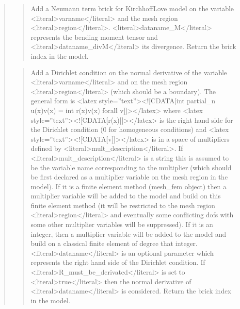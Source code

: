 \documentclass[a4paper,11pt,english]{sphinxmanual}
\begin{document}
\begin{quote}
\begin{quote}
\sphinxAtStartPar
Add a Neumann term brick for Kirchhoff\sphinxhyphen{}Love model
on the variable \textless{}literal\textgreater{}varname\textless{}/literal\textgreater{} and the mesh region \textless{}literal\textgreater{}region\textless{}/literal\textgreater{}.
\textless{}literal\textgreater{}dataname\_M\textless{}/literal\textgreater{} represents the bending moment tensor and  \textless{}literal\textgreater{}dataname\_divM\textless{}/literal\textgreater{}
its divergence.
Return the brick index in the model.
\end{quote}

\sphinxAtStartPar
{}
\begin{quote}

\sphinxAtStartPar
Add a Dirichlet condition on the normal derivative of the variable
\textless{}literal\textgreater{}varname\textless{}/literal\textgreater{} and on the mesh region \textless{}literal\textgreater{}region\textless{}/literal\textgreater{} (which should be a boundary).
The general form is
\textless{}latex style=”text”\textgreater{}\textless{}!{[}CDATA{[}int partial\_n u(x)v(x) = int r(x)v(x) forall v{]}{]}\textgreater{}\textless{}/latex\textgreater{}
where \textless{}latex style=”text”\textgreater{}\textless{}!{[}CDATA{[}r(x){]}{]}\textgreater{}\textless{}/latex\textgreater{} is
the right hand side for the Dirichlet condition (0 for
homogeneous conditions) and \textless{}latex style=”text”\textgreater{}\textless{}!{[}CDATA{[}v{]}{]}\textgreater{}\textless{}/latex\textgreater{} is in a space of multipliers
defined by \textless{}literal\textgreater{}mult\_description\textless{}/literal\textgreater{}.
If \textless{}literal\textgreater{}mult\_description\textless{}/literal\textgreater{} is a string this is assumed
to be the variable name corresponding to the multiplier (which should be
first declared as a multiplier variable on the mesh region in the model).
If it is a finite element method (mesh\_fem object) then a multiplier
variable will be added to the model and build on this finite element
method (it will be restricted to the mesh region \textless{}literal\textgreater{}region\textless{}/literal\textgreater{} and eventually
some conflicting dofs with some other multiplier variables will be
suppressed). If it is an integer, then a  multiplier variable will be
added to the model and build on a classical finite element of degree
that integer. \textless{}literal\textgreater{}dataname\textless{}/literal\textgreater{} is an optional parameter which represents
the right hand side of the Dirichlet condition.
If \textless{}literal\textgreater{}R\_must\_be\_derivated\textless{}/literal\textgreater{} is set to \textless{}literal\textgreater{}true\textless{}/literal\textgreater{} then the normal
derivative of \textless{}literal\textgreater{}dataname\textless{}/literal\textgreater{} is considered.
Return the brick index in the model.
\end{quote}


\end{quote}
\end{document}
